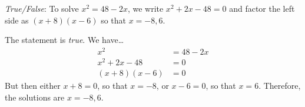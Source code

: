 \documentclass[11pt,letterpaper]{article}
\begin{document}
\quizsol \textit{True/False}: To solve $x^2= 48 - 2x$, we write $x^2 + 2x - 48= 0$ and factor the left side as $(x + 8)(x - 6)$ so that $x= -8, 6$. \pspace

\sol The statement is \textit{true}. We have\dots
	\[
	\begin{aligned}
	x^2&= 48 - 2x \\
	x^2 + 2x - 48&= 0 \\
	(x + 8)(x - 6)&= 0 
	\end{aligned}
	\]
But then either $x + 8= 0$, so that $x= -8$, or $x - 6=0$, so that $x= 6$. Therefore, the solutions are $x= -8, 6$. 
\end{document}
